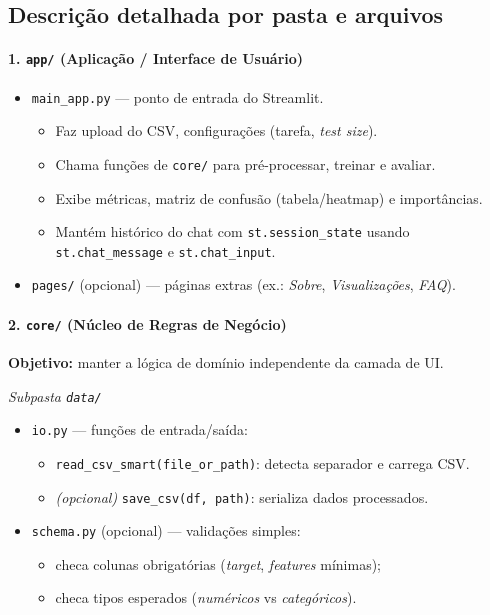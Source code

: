 \documentclass[12pt,a4paper]{article}
\begin{document}
\subsection{Descrição detalhada por pasta e arquivos}

\paragraph{1. \texttt{app/} (Aplicação / Interface de Usuário)}
\begin{itemize}
  \item \texttt{main\_app.py} --- ponto de entrada do Streamlit.
  \begin{itemize}
    \item Faz upload do CSV, configurações (tarefa, \textit{test size}).
    \item Chama funções de \texttt{core/} para pré-processar, treinar e avaliar.
    \item Exibe métricas, matriz de confusão (tabela/heatmap) e importâncias.
    \item Mantém histórico do chat com \texttt{st.session\_state} usando \texttt{st.chat\_message} e \texttt{st.chat\_input}.
  \end{itemize}
  \item \texttt{pages/} (opcional) --- páginas extras (ex.: \textit{Sobre}, \textit{Visualizações}, \textit{FAQ}).
\end{itemize}

\paragraph{2. \texttt{core/} (Núcleo de Regras de Negócio)}
\textbf{Objetivo:} manter a lógica de domínio independente da camada de UI.

\medskip
\emph{Subpasta \texttt{data/}}
\begin{itemize}
  \item \texttt{io.py} --- funções de entrada/saída:
  \begin{itemize}
    \item \texttt{read\_csv\_smart(file\_or\_path)}: detecta separador e carrega CSV.
    \item \textit{(opcional)} \texttt{save\_csv(df, path)}: serializa dados processados.
  \end{itemize}
  \item \texttt{schema.py} (opcional) --- validações simples:
  \begin{itemize}
    \item checa colunas obrigatórias (\textit{target}, \textit{features} mínimas);
    \item checa tipos esperados (\textit{numéricos} vs \textit{categóricos}).
  \end{itemize}
\end{itemize}
\end{document}
